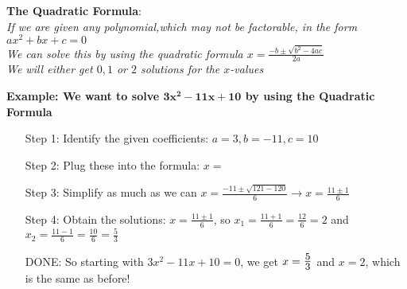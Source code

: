 \documentclass[12pt]{article}
\begin{document}
\noindent
\begin{tcolorbox}[
    width=\linewidth,
    colframe=black,         %
    colback=white,          %
    boxrule=0.5pt,          %
    left=1mm, right=1.1mm,    %
    top=1mm, bottom=1mm,    %
    arc=2mm                 %
]
\textbf{The Quadratic Formula}: \\
\textit{If we are given any polynomial,which may not be factorable, in the form $ax^2+bx+c=0$\\
We can solve this by using the quadratic formula
$x = \displaystyle\frac{-b \pm \sqrt{b^2 - 4ac}}{2a}$ \\
We will either get $0,1$ or $2$ solutions for the $x$-values}
\end{tcolorbox}
\noindent
    \textbf{Example: We want to solve $\mathbf{3x^2-11x+10}$ by using the Quadratic Formula}
\begin{enumerate}[
    leftmargin=1.75cm,
    labelsep=0pt,
    font=\bfseries
    ]
    \renewcommand{\labelenumi}{}

    \item[Step 1: ] Identify the given coefficients: $a=3, b=-11, c=10$
    \item[Step 2: ]  Plug these into the formula: $x = $
    \item[Step 3: ]  Simplify as much as we can $x = \displaystyle\frac{-11 \pm \sqrt{121-120}}{6} \longrightarrow x = \displaystyle\frac{11 \pm 1}{6}$
    \item[Step 4: ]  Obtain the solutions: $x = \displaystyle\frac{11 \pm 1}{6}$, so
    $x_1 = \displaystyle\frac{11 + 1}{6} = \displaystyle\frac{12}{6} = 2$ and $x_2 = \displaystyle\frac{11 - 1}{6} = \displaystyle\frac{10}{6} = \frac{5}{3}$
    \item[DONE: ]  So starting with $3x^2-11x+10=0$, we get $x=\scalebox{1.25}{$\frac{5}{3}$}$ and $x=2$, which is the same as before!
\end{enumerate}
\end{document}

